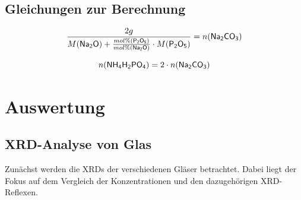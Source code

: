 \documentclass[12pt, a4paper]{article}
\begin{document}
\subsection{Gleichungen zur Berechnung}
\begin{equation}
  \frac{2 g}{M(\ce{Na2O})+\frac{mol\%  (\ce{P2O5})}{mol\%  (\ce{Na2O})}\cdot M(\ce{P2O5})}= n(\ce{Na2CO3})
\end{equation}

\begin{equation}
  n(\ce{NH4H2PO4})= 2 \cdot n(\ce{Na2CO3})
\end{equation}



\newpage
\section{Auswertung}
\subsection{XRD-Analyse von Glas}
Zunächst werden die XRDs der verschiedenen Gläser betrachtet. Dabei liegt der Fokus auf dem Vergleich der Konzentrationen und den dazugehörigen XRD-Reflexen.
\end{document}
